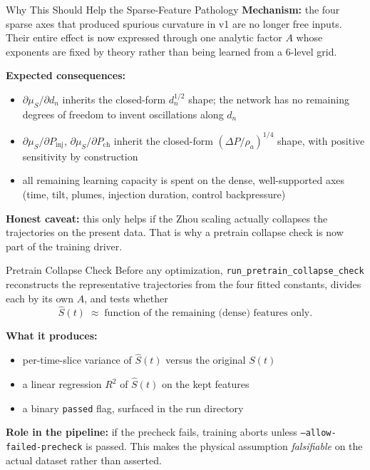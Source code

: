 \documentclass[UTF8,aspectratio=169]{ctexbeamer}
\begin{document}
\begin{frame}{Why This Should Help the Sparse-Feature Pathology}
\textbf{Mechanism:} the four sparse axes that produced spurious curvature in v1 are no longer free inputs. Their entire effect is now expressed through one analytic factor $A$ whose exponents are fixed by theory rather than being learned from a $6$-level grid.

\vspace{0.4em}
\textbf{Expected consequences:}
\begin{itemize}
  \item $\partial\mu_S/\partial d_n$ inherits the closed-form $d_n^{1/2}$ shape; the network has no remaining degrees of freedom to invent oscillations along $d_n$
  \item $\partial\mu_S/\partial P_{\mathrm{inj}}$, $\partial\mu_S/\partial P_{\mathrm{ch}}$ inherit the closed-form $(\Delta P/\rho_a)^{1/4}$ shape, with positive sensitivity by construction
  \item all remaining learning capacity is spent on the dense, well-supported axes (time, tilt, plumes, injection duration, control backpressure)
\end{itemize}

\vspace{0.3em}
\textbf{Honest caveat:} this only helps if the Zhou scaling actually collapses the trajectories on the present data. That is why a pretrain collapse check is now part of the training driver.
\end{frame}

\begin{frame}{Pretrain Collapse Check}
Before any optimization, \texttt{run\_pretrain\_collapse\_check} reconstructs the representative trajectories from the four fitted constants, divides each by its own $A$, and tests whether
\[
\hat S(t)\;\approx\;\text{function of the remaining (dense) features only}.
\]

\vspace{0.3em}
\textbf{What it produces:}
\begin{itemize}
  \item per-time-slice variance of $\hat S(t)$ versus the original $S(t)$
  \item a linear regression $R^{2}$ of $\hat S(t)$ on the kept features
  \item a binary \texttt{passed} flag, surfaced in the run directory
\end{itemize}

\vspace{0.3em}
\textbf{Role in the pipeline:} if the precheck fails, training aborts unless \texttt{--allow-failed-precheck} is passed. This makes the physical assumption \emph{falsifiable} on the actual dataset rather than asserted.
\end{frame}
\end{document}
